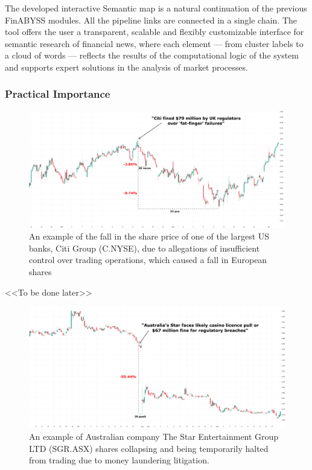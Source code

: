 The developed interactive Semantic map is a natural continuation of the previous FinABYSS modules. All the pipeline
links are connected in a single chain. The tool offers the user a transparent, scalable and flexibly customizable
interface for semantic research of financial news, where each element --- from cluster labels to a cloud
of words --- reflects the results of the computational logic of the system and supports expert solutions
in the analysis of market processes.

\subsubsection{Practical Importance}

\begin{figure}[H]
    \centering
    \includegraphics[width=1\linewidth]{img/citi_group.png}
    \caption{An example of the fall in the share price of one of the largest US banks, Citi Group
    (C.NYSE), due to allegations of insufficient control over trading operations, which caused
    a fall in European shares}
    \label{fig:citi_group}
\end{figure}

<<To be done later>>

\begin{figure}[H]
    \centering
    \includegraphics[width=1\linewidth]{img/star_entertainment.png}
    \caption{An example of Australian company The Star Entertainment Group LTD (SGR.ASX) shares
    collapsing and being temporarily halted from trading due to money laundering litigation.}
    \label{fig:star_entertainment}
\end{figure}